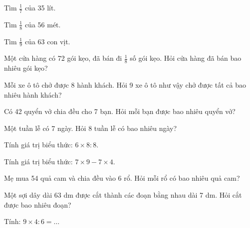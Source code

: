 \begin{ex}
Tìm $\frac{1}{7}$ của 35 lít.
\end{ex}

\begin{ex}
Tìm $\frac{1}{8}$ của 56 mét.
\end{ex}

\begin{ex}
Tìm $\frac{1}{9}$ của 63 con vịt.
\end{ex}

\begin{ex}
Một cửa hàng có 72 gói kẹo, đã bán đi $\frac{1}{8}$ số gói kẹo. Hỏi cửa hàng đã bán bao nhiêu gói kẹo?
\end{ex}

\begin{ex}
Mỗi xe ô tô chở được 8 hành khách. Hỏi 9 xe ô tô như vậy chở được tất cả bao nhiêu hành khách?
\end{ex}

\begin{ex}
Có 42 quyển vở chia đều cho 7 bạn. Hỏi mỗi bạn được bao nhiêu quyển vở?
\end{ex}

\begin{ex}
Một tuần lễ có 7 ngày. Hỏi 8 tuần lễ có bao nhiêu ngày?
\end{ex}

\begin{ex}
Tính giá trị biểu thức: $6 \times 8 : 8$.
\end{ex}

\begin{ex}
Tính giá trị biểu thức: $7 \times 9 - 7 \times 4$.
\end{ex}

\begin{ex}
Mẹ mua 54 quả cam và chia đều vào 6 rổ. Hỏi mỗi rổ có bao nhiêu quả cam?
\end{ex}

\begin{ex}
Một sợi dây dài 63 dm được cắt thành các đoạn bằng nhau dài 7 dm. Hỏi cắt được bao nhiêu đoạn?
\end{ex}

\begin{ex}
Tính: $9 \times 4 : 6 = \dots$
\end{ex}
